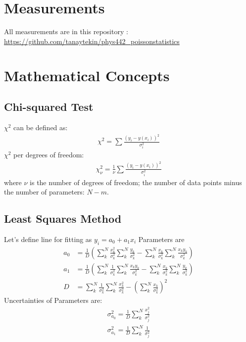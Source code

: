 \documentclass[reprint,amsmath,aps,nofootinbib,english]{revtex4-2}
\begin{document}
\newpage
\appendix
\section{Measurements}
All measurements are in this repository : \url{https://github.com/tanaytekin/phys442_poissonstatistics} 
\section{Mathematical Concepts}

\subsection{Chi-squared Test}
$\chi^2$ can be defined as:
\begin{align}
  \chi^2 = \sum \frac{(y_i -y(x_i))^2}{\sigma^2_i}
\end{align}
$\chi^2$ per degrees of freedom:
\begin{align}
  \chi^2_\nu = \frac{1}{\nu} \sum \frac{(y_i -y(x_i))^2}{\sigma^2_i}
\end{align}
where $\nu$ is the number of degrees of freedom; the number of data points minus the number of parameters: $N-m$.

\subsection{Least Squares Method}

Let's define line for fitting as $y_i = a_0 + a_1x_i$
Parameters are
\begin{align}
  a_0 &= \frac{1}{D}\left(\sum_{k}^{N}\frac{x^2_k}{\sigma^2_k} \sum_{k}^{N}\frac{y_k}{\sigma^2_k} - \sum_{k}^{N}\frac{x_k}{\sigma^2_k} \sum_{k}^{N}\frac{x_k y_k}{\sigma^2_k}\right) \\
    a_1 &= \frac{1}{D}\left(\sum_{k}^{N}\frac{1}{\sigma^2_k} \sum_{k}^{N}\frac{x_k y_k}{\sigma^2_k} - \sum_{k}^{N}\frac{x_k}{\sigma^2_k} \sum_{k}^{N}\frac{y_k}{\sigma^2_k}\right) \\
    D &= \sum_{k}^{N}\frac{1}{\sigma^2_k} \sum_{k}^{N}\frac{x^2_k}{\sigma^2_k} - \left(\sum_{k}^{N}\frac{x_k}{\sigma^2_k}\right)^2
\end{align}
Uncertainties of Parameters are:
\begin{align}
\sigma^2_{a_0} = \frac{1}{D} \sum_{k}^{N}\frac{x^2_j}{\sigma^2_j} \\
\sigma^2_{a_1} = \frac{1}{D} \sum_{k}^{N}\frac{1}{\sigma^2_j}
\end{align}
\end{document}
